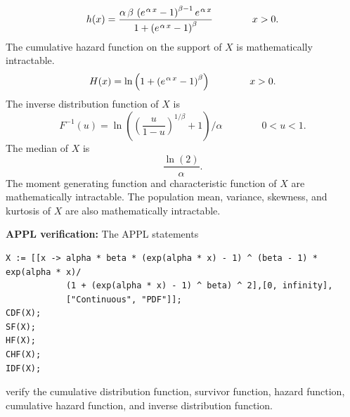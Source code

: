 \documentclass[12pt,fullpage]{article}
\begin{document}
$$
h(x) = {\frac {{\it \alpha}\,{\it \beta}\, \left( {e^{{\it \kern 0.08 em \alpha}\,x
}}-1 \right) ^{{\it \beta}-1}{e^{{\it \kern 0.08 em \alpha}\,x}}}{1+ \left( {e^{{\it 
\kern 0.08 em \alpha}\,x}}-1 \right) ^{{\it \beta}}}} \qquad \qquad x > 0.
$$
The cumulative hazard function on the support of $X$ is mathematically intractable.
$$
H(x) = \ln  \left( 1+ \left( {e^{{\it \kern 0.08 em \alpha}\,x}}-1 \right) ^{{
\it \beta}} \right) \qquad \qquad x > 0.
$$
The inverse distribution function of $X$ is
$$
F ^ {-1}(u) = \ln  \left(  \left( {\frac {u}{1-u}} \right) ^{1/\beta}+1 \right)\Big/\alpha \qquad \qquad 0 < u < 1.
$$
The median of $X$ is
$$
\frac{\ln(2)}{\alpha}.
$$
The moment generating function and characteristic function of $X$ are mathematically intractable. The population mean, variance, skewness, and kurtosis of $X$ are also mathematically intractable.

\vspace{0.1in}

\noindent
{\bf APPL verification:}
The APPL statements
\begin{verbatim}
X := [[x -> alpha * beta * (exp(alpha * x) - 1) ^ (beta - 1) * exp(alpha * x)/
            (1 + (exp(alpha * x) - 1) ^ beta) ^ 2],[0, infinity],
            ["Continuous", "PDF"]];
CDF(X);
SF(X);
HF(X);
CHF(X);
IDF(X);
\end{verbatim}
verify the cumulative distribution function, survivor function, hazard function, cumulative hazard function, and inverse distribution function.
\end{document}
